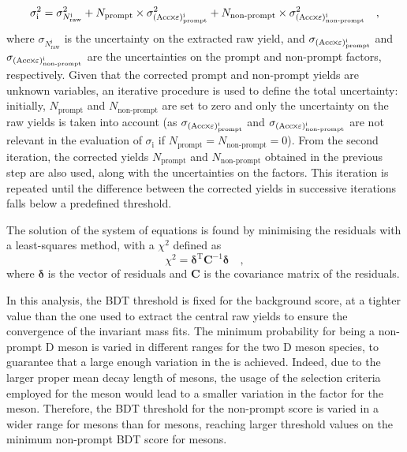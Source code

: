 \begin{equation*}
    \sigma_\mathrm{i}^2 = \sigma_{N_\mathrm{raw}^\mathrm{i}}^2 + N_\mathrm{prompt}\times\sigma^2_{(\mathrm{Acc}\mkern-2mu\times\mkern-2mu\varepsilon)_\mathrm{prompt}^\mathrm{i}} + N_\mathrm{non\text{-}prompt}\times\sigma^2_{(\mathrm{Acc}\mkern-2mu\times\mkern-2mu\varepsilon)_\mathrm{non\text{-}prompt}^\mathrm{i}}\quad ,
\end{equation*}
where $\sigma_{N_\mathrm{raw}^\mathrm{i}}$ is the uncertainty on the extracted raw yield, and $\sigma_{(\mathrm{Acc}\mkern-2mu\times\mkern-2mu\varepsilon)_\mathrm{prompt}^\mathrm{i}}$ and $\sigma_{(\mathrm{Acc}\mkern-2mu\times\mkern-2mu\varepsilon)_\mathrm{non\text{-}prompt}^\mathrm{i}}$ are the uncertainties on the prompt and non-prompt \aeff factors, respectively. Given that the corrected prompt and non-prompt yields are unknown variables, an iterative procedure is used to define the total uncertainty: initially, $N_{\mathrm{prompt}}$ and $N_{\mathrm{non\text{-}prompt}}$ are set to zero and only the uncertainty on the raw yields is taken into account (as $\sigma_{(\mathrm{Acc}\mkern-2mu\times\mkern-2mu\varepsilon)_\mathrm{prompt}^\mathrm{i}}$ and $\sigma_{(\mathrm{Acc}\mkern-2mu\times\mkern-2mu\varepsilon)_\mathrm{non\text{-}prompt}^\mathrm{i}}$ are not relevant in the evaluation of $\sigma_\mathrm{i}$ if $N_\mathrm{prompt}=N_\mathrm{non\text{-}prompt}=0$). From the second iteration, the corrected yields $N_{\mathrm{prompt}}$ and $N_{\mathrm{non\text{-}prompt}}$ obtained in the previous step are also used, along with the uncertainties on the \aeff factors. This iteration is repeated until the difference between the corrected yields in successive iterations falls below a predefined threshold.

The solution of the system of equations is found by minimising the residuals with a least-squares method, with a $\chi^2$ defined as 
\begin{equation*}
    \chi^2 = \pmb{\delta}^\mathrm{T}\mathbf{C}^{-1}\pmb{\delta}\quad ,
\end{equation*}
where $\pmb{\delta}$ is the vector of residuals and $\mathbf{C}$ is the covariance matrix of the residuals.

In this analysis, the BDT threshold is fixed for the background score, at a tighter value than the one used to extract the central raw yields to ensure the convergence of the invariant mass fits. The minimum probability for being a non-prompt D meson is varied in different ranges for the two D meson species, to guarantee that a large enough variation in the \fnp is achieved. Indeed, due to the larger proper mean decay length of \dpl mesons, the usage of the selection criteria employed for the \ds meson would lead to a smaller variation in the \fnp factor for the \dpl meson. Therefore, the BDT threshold for the non-prompt score is varied in a wider range for \dpl mesons than for \ds mesons, reaching larger threshold values on the minimum non-prompt BDT score for \dpl mesons. 

